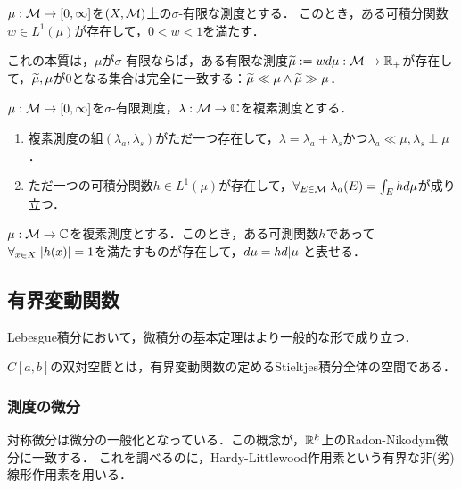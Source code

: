 \documentclass[uplatex,dvipdfmx]{jsreport}
\begin{document}
\begin{lemma}
    $\mu:\mathcal{M}\to[0,\infty]$を$(X,\mathcal{M})$上の$\sigma$-有限な測度とする．
    このとき，ある可積分関数$w\in L^1(\mu)$が存在して，$0<w<1$を満たす．
\end{lemma}
\begin{remarks}
    これの本質は，$\mu$が$\sigma$-有限ならば，ある有限な測度$\widetilde{\mu}:=wd\mu:\mathcal{M}\to\mathbb{R}_+$が存在して，$\widetilde{\mu},\mu$が$0$となる集合は完全に一致する：$\widetilde{\mu}\ll\mu\land\widetilde{\mu}\gg\mu$．
\end{remarks}
\begin{theorem}
    $\mu:\mathcal{M}\to[0,\infty]$を$\sigma$-有限測度，$\lambda:\mathcal{M}\to\mathbb{C}$を複素測度とする．
    \begin{enumerate}
        \item 複素測度の組$(\lambda_a,\lambda_s)$がただ一つ存在して，$\lambda=\lambda_a+\lambda_s$かつ$\lambda_a\ll\mu,\lambda_s\perp\mu$．
        \item ただ一つの可積分関数$h\in L^1(\mu)$が存在して，$\forall_{E\in\mathcal{M}}\;\lambda_a(E)=\int_Ehd\mu$が成り立つ．
    \end{enumerate}
\end{theorem}

\begin{corollary}[複素測度の極分解]
    $\mu:\mathcal{M}\to\mathbb{C}$を複素測度とする．このとき，ある可測関数$h$であって$\forall_{x\in X}\;\lvert h(x)\rvert=1$を満たすものが存在して，$d\mu=hd\lvert\mu\rvert$と表せる．
\end{corollary}

\subsection{有界変動関数}

\begin{tcolorbox}[colframe=ForestGreen, colback=ForestGreen!10!white,breakable,colbacktitle=ForestGreen!40!white,coltitle=black,fonttitle=\bfseries\sffamily,
title=]
    Lebesgue積分において，微積分の基本定理はより一般的な形で成り立つ．

    $C[a,b]$の双対空間とは，有界変動関数の定めるStieltjes積分全体の空間である．
\end{tcolorbox}

\subsubsection{測度の微分}

\begin{tcolorbox}[colframe=ForestGreen, colback=ForestGreen!10!white,breakable,colbacktitle=ForestGreen!40!white,coltitle=black,fonttitle=\bfseries\sffamily,
title=]
    対称微分は微分の一般化となっている．この概念が，$\mathbb{R}^k$上のRadon-Nikodym微分に一致する．
    これを調べるのに，Hardy-Littlewood作用素という有界な非(劣)線形作用素を用いる．
\end{tcolorbox}
\end{document}
